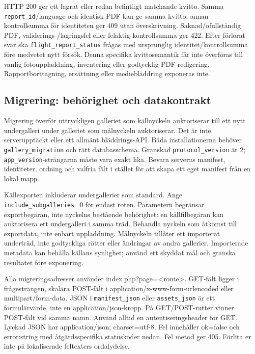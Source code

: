 \documentclass[11pt,a4paper]{article}
\newcommand{\codeword}[1]{\nolinkurl{#1}}
\begin{document}
HTTP 200 ger ett lagrat eller redan befintligt matchande kvitto. Samma
\codeword{report_id}/language och identisk PDF kan ge samma kvitto; annan kontrollsumma för
identiteten ger 409 utan överskrivning. Saknad/ofullständig PDF, validerings-/lagringsfel
eller felaktig kontrollsumma ger 422. Efter förlorat svar ska
\codeword{flight_report_status} frågas med ursprunglig identitet/kontrollsumma före medvetet
nytt försök. Denna specifika kvittosemantik får inte överföras till vanlig fotouppladdning,
inventering eller godtycklig PDF-redigering. Rapportborttagning, ersättning eller
mediebläddring exponeras inte.

\subsection{\texorpdfstring{Migrering: behörighet och datakontrakt}{Migrering: behörighet och datakontrakt}}

\label{api352:migration-contract}

Migrering överför uttryckligen galleriet som källnyckeln auktoriserar till ett nytt
undergalleri under galleriet som målnyckeln auktoriserar. Det är inte serverupptäckt eller
ett allmänt bläddrings-API. Båda installationerna behöver \codeword{gallery_migration} och
rätt databasschema. Granskad \codeword{protocol_version} är 2;
\codeword{app_version}-strängarna måste vara exakt lika. Bevara serverns manifest,
identiteter, ordning och valfria fält i stället för att skapa ett eget manifest från en
lokal mapp.

Källexporten inkluderar undergallerier som standard. Ange \codeword{include_subgalleries}=0
för endast roten. Parametern begränsar exportbegäran, inte nyckelns bestående behörighet: en
källfilbegäran kan auktorisera ett undergalleri i samma träd. Behandla nyckeln som åtkomst
till exportdata, inte enbart uppladdning. Målnyckeln tillåter ett importerat underträd, inte
godtyckliga rötter eller ändringar av andra gallerier. Importerade metadata kan behålla
källans synlighet; använd ett skyddat mål och granska resultatet före exponering.

Alla migreringsadresser använder index.php?page=<route>. GET-fält ligger i frågesträngen,
skalära POST-fält i application/x-www-form-urlencoded eller multipart/form-data. JSON i
\codeword{manifest_json} eller \codeword{assets_json} är ett formulärvärde, inte en
application/json-kropp. På GET/POST-rutter vinner POST-fält vid samma namn. Använd alltid en
autentiseringsheader för GET. Lyckad JSON har application/json; charset=utf-8. Fel
innehåller ok=false och error:string med åtgärdsspecifika statuskoder nedan. Fel metod ger
405. Förlita er inte på lokaliserade feltexters ordalydelse.
\end{document}

